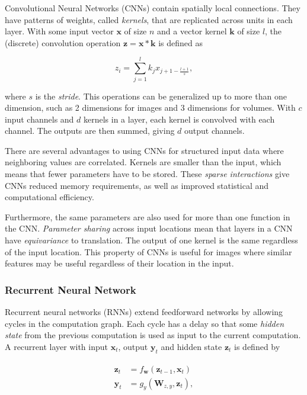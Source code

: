 Convolutional Neural Networks (CNNs) contain spatially local connections.
They have patterns of weights, called \textit{kernels}, that are replicated across units in each layer.
With some input vector \(\mathbf{x}\) of size \(n\) and a vector kernel \(\mathbf{k}\) of size \(l\), the (discrete) convolution operation \(\mathbf{z} = \mathbf{x} \ast \mathbf{k}\) is defined as

\begin{equation}
    z_i = \sum_{j=1}^l k_j x_{j+1-\frac{l+1}{s}},
\end{equation}

where \(s\) is the \textit{stride}. This operations can be generalized up to more than one dimension, such as 2 dimensions for images and 3 dimensions for volumes.
With \(c\) input channels and \(d\) kernels in a layer, each kernel is convolved with each channel. The outputs are then summed, giving \(d\) output channels. 

There are several advantages to using CNNs for structured input data where neighboring values are correlated.
Kernels are smaller than the input, which means that fewer parameters have to be stored.
These \textit{sparse interactions} give CNNs reduced memory requirements,
as well as improved statistical and computational efficiency.

Furthermore, the same parameters are also used for more than one function in the CNN. \textit{Parameter sharing} across input locations mean that layers in a CNN have \textit{equivariance} to translation. 
The output of one kernel is the same regardless of the input location.
This property of CNNs is useful for images where similar features may be useful regardless of their location in the input.~\cite{goodfellow_deep_2016}


\subsubsection{Recurrent Neural Network}

Recurrent neural networks (RNNs) extend feedforward networks by allowing cycles in the computation graph.
Each cycle has a delay so that some \textit{hidden state} from the previous computation is used as input to the current computation.
A recurrent layer with input \(\mathbf{x}_t\), output \(\mathbf{y}_t\) and hidden state \(\mathbf{z}_t\) is defined by

\begin{align}
    \begin{split}
        \mathbf{z}_t &= f_\mathbf{w}(\mathbf{z}_{t-1}, \mathbf{x}_t) \\
        \mathbf{y}_t &= g_y(\mathbf{W}_{z,y}, \mathbf{z}_t),
    \end{split}
\end{align}

